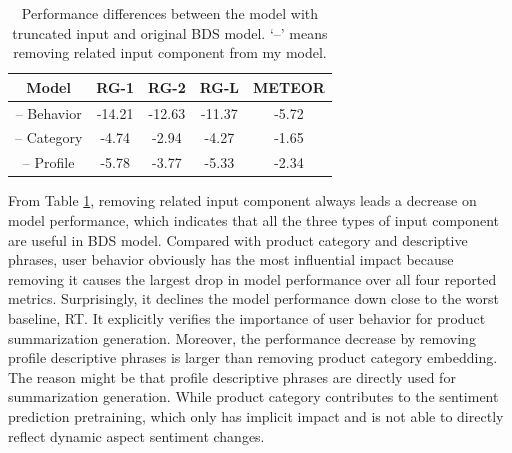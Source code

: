 \begin{table}%
	\centering
	\begin{tabular}{|c|c|c|c|c|} 
		\hline
		
		\textbf{Model}& \textbf{RG-1} & \textbf{RG-2} & \textbf{RG-L} & \textbf{METEOR}\\ \hline
		-- Behavior &-14.21 & -12.63&-11.37  & -5.72\\  
		-- Category&-4.74 & -2.94&-4.27 & -1.65 \\
		-- Profile &-5.78 & -3.77&-5.33& -2.34\\  
		\hline
	\end{tabular} 
	\caption{Performance differences between the model with truncated input and original BDS model. `--' means removing related input component from my model.}
	\label{tab:c5_ablation} 
\end{table}
From Table \ref{tab:c5_ablation}, removing related input component always leads a decrease on model performance, which indicates that all the three types of input component are useful in BDS model. Compared with product category and descriptive phrases, user behavior obviously has the most influential impact because removing it causes the largest drop in model performance over all four reported metrics. Surprisingly, it declines the model performance down close to the worst baseline, RT. It explicitly verifies the importance of user behavior for product summarization generation. Moreover, the performance decrease by removing profile descriptive phrases is larger than removing product category embedding. The reason might be that profile descriptive phrases are directly used for summarization generation. While product category contributes to the sentiment prediction pretraining, which only has implicit impact and is not able to directly reflect dynamic aspect sentiment changes. 
 
